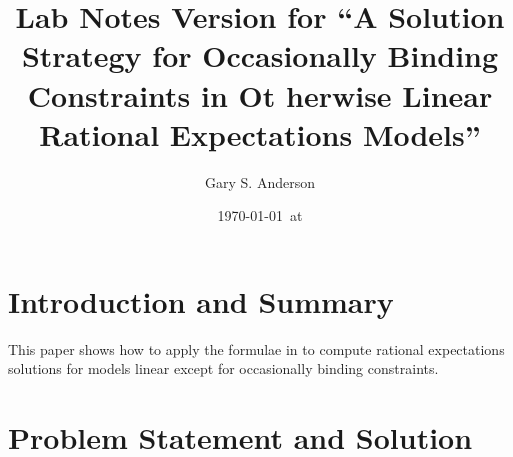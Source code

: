 \documentclass[12pt]{article}
\title{Lab Notes Version for ``A Solution Strategy for Occasionally Binding Constraints in Ot
herwise
Linear Rational Expectations Models''}
\author{Gary S. Anderson}
\date{\today \   at \currenttime}
\begin{document}
\maketitle




\section{Introduction and Summary}
\label{sec:introduction-summary}

This paper shows how to apply the formulae in\citep{anderson10} to compute 
rational expectations solutions for models linear except for occasionally binding constraints.

\section{Problem Statement and Solution}
\label{sec:probl-stat-solut}





\end{document}
